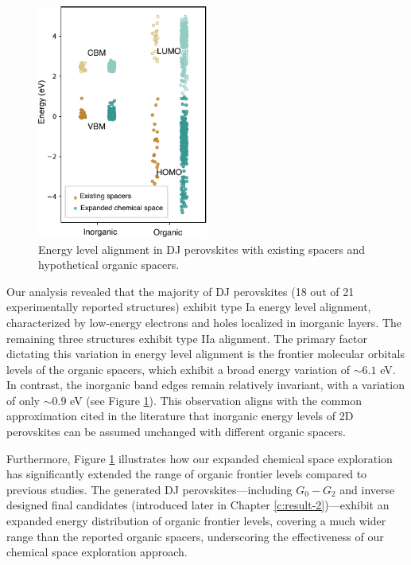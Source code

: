 \begin{figure}[htbp]
    \centering
    \includegraphics[width=0.5\textwidth]{figures/HT-ML/figure4-5.pdf}
    \caption{Energy level alignment in DJ perovskites with existing spacers and hypothetical organic spacers.}
    \label{fig:figure4.5}
\end{figure}

Our analysis revealed that the majority of DJ perovskites (18 out of 21 experimentally reported structures) exhibit type Ia energy level alignment, characterized by low-energy electrons and holes localized in inorganic layers. The remaining three structures exhibit type IIa alignment. The primary factor dictating this variation in energy level alignment is the frontier molecular orbitals levels of the organic spacers, which exhibit a broad energy variation of $\sim6.1$ eV. In contrast, the inorganic band edges remain relatively invariant, with a variation of only $\sim0.9$ eV (see Figure \ref{fig:figure4.5}). This observation aligns with the common approximation cited in the literature that inorganic energy levels of 2D perovskites can be assumed unchanged with different organic spacers\cite{RN18,RN20}. 

Furthermore, Figure \ref{fig:figure4.5} illustrates how our expanded chemical space exploration has significantly extended the range of organic frontier levels compared to previous studies. The generated DJ perovskites—including $G_0-G_2$ and inverse designed final candidates (introduced later in Chapter \ref{c:result-2})—exhibit an expanded energy distribution of organic frontier levels, covering a much wider range than the reported organic spacers, underscoring the effectiveness of our chemical space exploration approach. 

